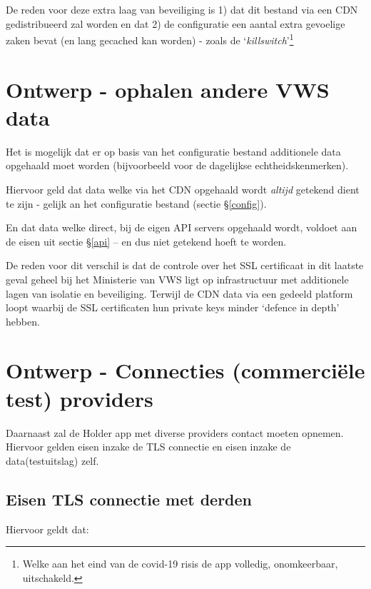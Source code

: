 \documentclass[11.0pt,twoside,openright]{report}
\begin{document}
De reden voor deze extra laag van beveiliging is 1) dat dit bestand via een CDN gedistribueerd zal worden en dat 2) de configuratie een aantal extra gevoelige zaken bevat (en lang gecached kan worden) - zoals de `\emph{killswitch}'\footnote{Welke aan het eind van de covid-19 risis de app volledig, onomkeerbaar, uitschakeld.}

\section{Ontwerp - ophalen andere VWS data}

Het is mogelijk dat er op basis van het configuratie bestand additionele data opgehaald moet worden (bijvoorbeeld voor de dagelijkse echtheidskenmerken).

Hiervoor geld dat data welke via het CDN opgehaald wordt \emph{altijd} getekend dient te zijn - gelijk an het configuratie bestand (sectie \S\ref{config}).

En dat data welke direct, bij de eigen API servers opgehaald wordt, voldoet aan de eisen uit sectie \S\ref{api} -- en dus niet getekend hoeft te worden.

De reden voor dit verschil is dat de controle over het SSL certificaat in dit laatste geval geheel bij het Ministerie van VWS ligt op infrastructuur met additionele lagen van isolatie en beveiliging. Terwijl de CDN data via een gedeeld platform loopt waarbij de SSL certificaten hun private keys minder `defence in depth' hebben.

\pagebreak
\section{Ontwerp - Connecties (commerciële test) providers}

Daarnaast zal de Holder app met diverse providers contact moeten opnemen. Hiervoor gelden eisen inzake de TLS connectie en eisen inzake de data(testuitslag) zelf.

\subsection{Eisen TLS connectie met derden}

Hiervoor geldt dat:
\end{document}
